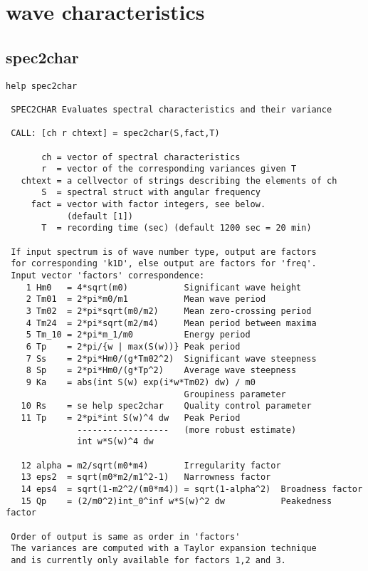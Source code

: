 \newpage
\section{\progname{} wave characteristics}\label{sec:WAFOcharacteristics}

\subsection{spec2char}\label{ss:spectralcharacteristics}
{\small\begin{verbatim}
help spec2char

 SPEC2CHAR Evaluates spectral characteristics and their variance

 CALL: [ch r chtext] = spec2char(S,fact,T)

       ch = vector of spectral characteristics
       r  = vector of the corresponding variances given T
   chtext = a cellvector of strings describing the elements of ch
       S  = spectral struct with angular frequency
     fact = vector with factor integers, see below.
            (default [1])
       T  = recording time (sec) (default 1200 sec = 20 min)

 If input spectrum is of wave number type, output are factors
 for corresponding 'k1D', else output are factors for 'freq'.
 Input vector 'factors' correspondence:
    1 Hm0   = 4*sqrt(m0)           Significant wave height
    2 Tm01  = 2*pi*m0/m1           Mean wave period
    3 Tm02  = 2*pi*sqrt(m0/m2)     Mean zero-crossing period
    4 Tm24  = 2*pi*sqrt(m2/m4)     Mean period between maxima
    5 Tm_10 = 2*pi*m_1/m0          Energy period
    6 Tp    = 2*pi/{w | max(S(w))} Peak period
    7 Ss    = 2*pi*Hm0/(g*Tm02^2)  Significant wave steepness
    8 Sp    = 2*pi*Hm0/(g*Tp^2)    Average wave steepness
    9 Ka    = abs(int S(w) exp(i*w*Tm02) dw) / m0
                                   Groupiness parameter
   10 Rs    = se help spec2char    Quality control parameter
   11 Tp    = 2*pi*int S(w)^4 dw   Peak Period
              ------------------   (more robust estimate)
              int w*S(w)^4 dw

   12 alpha = m2/sqrt(m0*m4)       Irregularity factor
   13 eps2  = sqrt(m0*m2/m1^2-1)   Narrowness factor
   14 eps4  = sqrt(1-m2^2/(m0*m4)) = sqrt(1-alpha^2)  Broadness factor
   15 Qp    = (2/m0^2)int_0^inf w*S(w)^2 dw           Peakedness factor

 Order of output is same as order in 'factors'
 The variances are computed with a Taylor expansion technique
 and is currently only available for factors 1,2 and 3.
\end{verbatim}}

